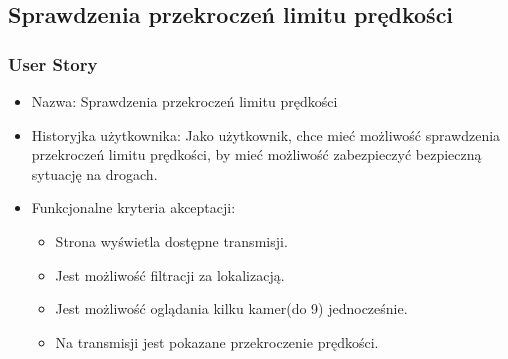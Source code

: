 \documentclass[12pt]{article}
\begin{document}
\subsection{Sprawdzenia przekroczeń limitu prędkości}

\subsubsection{User Story}
\begin{itemize}
\item Nazwa: Sprawdzenia przekroczeń limitu prędkości
\item Historyjka użytkownika: Jako użytkownik, chce mieć możliwość sprawdzenia przekroczeń limitu prędkości, by mieć możliwość zabezpieczyć bezpieczną sytuację na drogach.
\item Funkcjonalne kryteria akceptacji: 
	\begin{itemize}
	\item Strona wyświetla dostępne transmisji.
	\item Jest możliwość filtracji za lokalizacją.
	\item Jest możliwość oglądania kilku kamer(do 9) jednocześnie.
	\item Na transmisji jest pokazane przekroczenie prędkości.
	\end{itemize}
\end{itemize}
\end{document}
